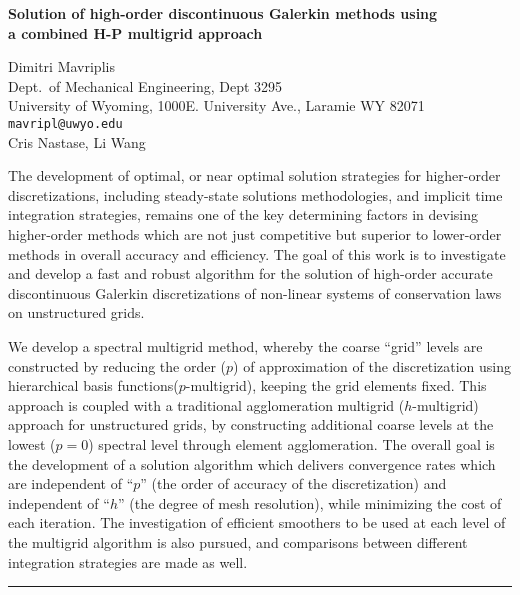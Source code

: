 \documentclass[twosided]{report}
\begin{document}
\begin{center}
{\large			%
{\bf Solution of high-order discontinuous Galerkin methods using \\
	a combined H-P multigrid approach}}

	Dimitri Mavriplis \\
	Dept.~of Mechanical Engineering, Dept 3295 \\
	University of Wyoming, 1000E. University Ave., Laramie WY 82071 \\
	{\tt mavripl@uwyo.edu} \\
	Cris Nastase, Li Wang
\end{center}
The development of optimal, or near optimal solution
strategies for higher-order discretizations, including
steady-state solutions methodologies, and implicit time
integration strategies, remains one of the key determining
factors in devising higher-order methods which are not just
competitive but superior to lower-order methods in overall
accuracy and efficiency. The goal of this work is to
investigate and develop a fast and robust algorithm for the
solution of high-order accurate discontinuous Galerkin
discretizations of non-linear systems of conservation laws
on unstructured grids.

We develop a spectral multigrid
method, whereby the coarse ``grid'' levels are constructed by
reducing the order ($p$) of approximation of the
discretization using hierarchical basis
functions($p$-multigrid), keeping the grid elements fixed.
This approach is coupled with a traditional agglomeration
multigrid ($h$-multigrid) approach for unstructured grids,
by constructing additional coarse levels at the lowest
($p=0$) spectral level through element agglomeration. The
overall goal is the development of a solution algorithm
which delivers convergence rates which are independent of
``$p$'' (the order of accuracy of the discretization) and
independent of ``$h$'' (the degree of mesh resolution), while
minimizing the cost of each iteration. The investigation of
efficient smoothers to be used at each level of the
multigrid algorithm is also pursued, and comparisons between
different integration strategies are made as well.



	\begin{center} \rule{6in}{1pt} \end{center}
\end{document}

